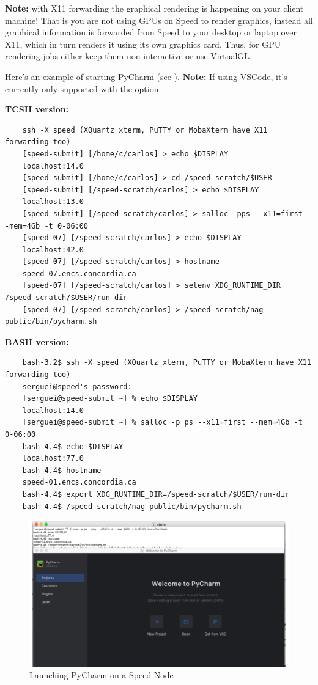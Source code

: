 \noindent\textbf{Note:} with X11 forwarding the graphical rendering is happening on your client machine!
That is you are not using GPUs on Speed to render graphics,
instead all graphical information is forwarded from Speed to your desktop or laptop over X11,
which in turn renders it using its own graphics card. Thus, for GPU rendering jobs either keep them
non-interactive or use VirtualGL.

\noindent Here's an example of starting PyCharm (see ).
\textbf{Note:} If using VSCode, it's currently only supported with the  option.

\textbf{TCSH version:}
\scriptsize
\begin{verbatim}
    ssh -X speed (XQuartz xterm, PuTTY or MobaXterm have X11 forwarding too)
    [speed-submit] [/home/c/carlos] > echo $DISPLAY
    localhost:14.0
    [speed-submit] [/home/c/carlos] > cd /speed-scratch/$USER
    [speed-submit] [/speed-scratch/carlos] > echo $DISPLAY
    localhost:13.0
    [speed-submit] [/speed-scratch/carlos] > salloc -pps --x11=first --mem=4Gb -t 0-06:00
    [speed-07] [/speed-scratch/carlos] > echo $DISPLAY
    localhost:42.0
    [speed-07] [/speed-scratch/carlos] > hostname
    speed-07.encs.concordia.ca
    [speed-07] [/speed-scratch/carlos] > setenv XDG_RUNTIME_DIR /speed-scratch/$USER/run-dir
    [speed-07] [/speed-scratch/carlos] > /speed-scratch/nag-public/bin/pycharm.sh
\end{verbatim}
\normalsize

\textbf{BASH version:}
\scriptsize
    \begin{verbatim}
    bash-3.2$ ssh -X speed (XQuartz xterm, PuTTY or MobaXterm have X11 forwarding too)
    serguei@speed's password:
    [serguei@speed-submit ~] % echo $DISPLAY
    localhost:14.0
    [serguei@speed-submit ~] % salloc -p ps --x11=first --mem=4Gb -t 0-06:00
    bash-4.4$ echo $DISPLAY
    localhost:77.0
    bash-4.4$ hostname
    speed-01.encs.concordia.ca
    bash-4.4$ export XDG_RUNTIME_DIR=/speed-scratch/$USER/run-dir
    bash-4.4$ /speed-scratch/nag-public/bin/pycharm.sh
\end{verbatim}
\normalsize

\begin{figure}[htpb]
	\includegraphics[width=\columnwidth]{images/pycharm}
	\caption{Launching PyCharm on a Speed Node}
	\label{fig:pycharm}
\end{figure}

